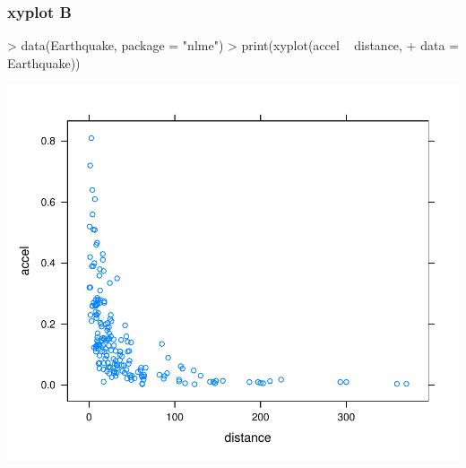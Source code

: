 \begin{frame}
  \frametitle{xyplot B}
\begin{Schunk}
\begin{Sinput}
> data(Earthquake, package = "nlme")
> print(xyplot(accel ~ distance, 
+     data = Earthquake))
\end{Sinput}
\end{Schunk}
\includegraphics{plots/fig-022}
\end{frame}


